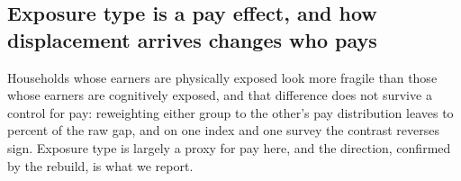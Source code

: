 \subsection{Exposure type is a pay effect, and how displacement arrives changes who pays}

Households whose earners are physically exposed look more fragile than those whose earners are
cognitively exposed, and that difference does not survive a control for pay: reweighting either
group to the other's pay distribution leaves  to
 percent of the raw gap, and on one index and one survey the contrast
reverses sign. Exposure type is largely a proxy for pay here, and the direction, confirmed by the
rebuild, is what we report.


